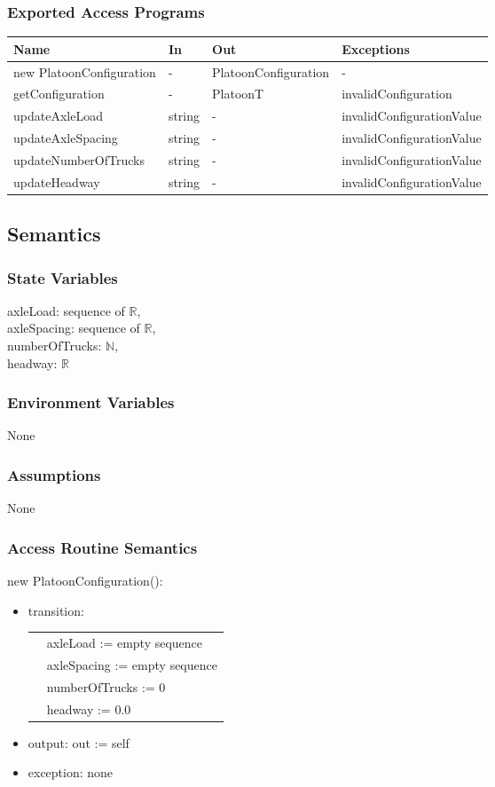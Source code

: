 \documentclass[12pt, titlepage]{article}
\begin{document}
\subsubsection{Exported Access Programs}
\begin{center}
\begin{tabular}{p{5cm} p{2cm} p{4cm} p{5cm}}
\hline
\textbf{Name} & \textbf{In} & \textbf{Out} & \textbf{Exceptions} \\
\hline
new PlatoonConfiguration & - & PlatoonConfiguration & - \\
\hline
getConfiguration & - & PlatoonT & invalidConfiguration \\
\hline
updateAxleLoad & string & - & invalidConfigurationValue\\
\hline
updateAxleSpacing & string & - & invalidConfigurationValue\\
\hline
updateNumberOfTrucks & string & - & invalidConfigurationValue\\
\hline
updateHeadway & string & - & invalidConfigurationValue\\
\end{tabular}
\end{center}

\subsection{Semantics}

\subsubsection{State Variables}
axleLoad: sequence of $\mathbb{R}$,\\
axleSpacing: sequence of $\mathbb{R}$,\\
numberOfTrucks: $\mathbb{N}$,\\
headway: $\mathbb{R}$
\subsubsection{Environment Variables}
None
\subsubsection{Assumptions}
None
\subsubsection{Access Routine Semantics}

\noindent new PlatoonConfiguration():
\begin{itemize}
\item transition:\\
        \begin{tabular}{p{1cm} p{8cm}}
        & axleLoad := empty sequence\\
		& axleSpacing := empty sequence\\
		& numberOfTrucks := 0\\
		& headway := 0.0\\
        \end{tabular}
\item output: out := self
\item exception: none
\end{itemize}
\end{document}
